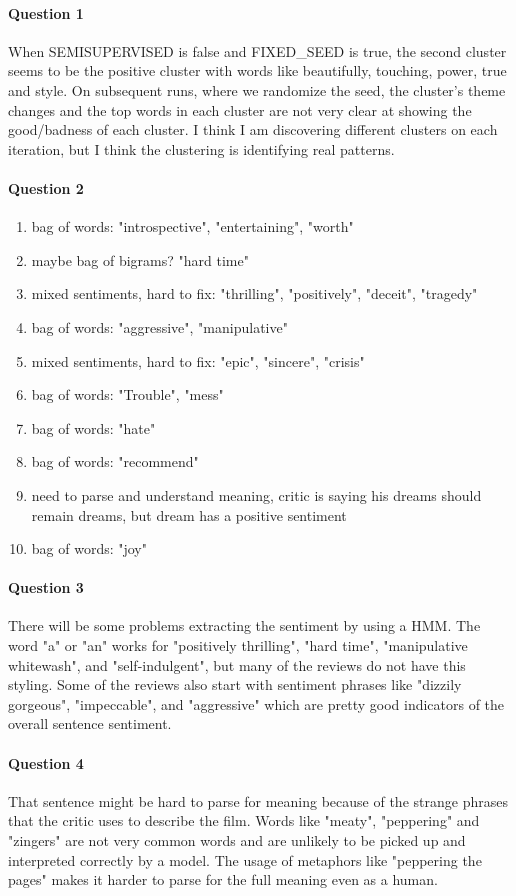 \documentclass[12pt]{article}
\newcommand{\myparagraph}[1]{\paragraph{#1}\mbox{}}
\begin{document}
\thispagestyle{fancy}

\myparagraph{Question 1}

When SEMISUPERVISED is false and FIXED\_SEED is true, the second cluster seems to be the positive cluster with words like beautifully, touching, power, true and style. On subsequent runs, where we randomize the seed, the cluster's theme changes and the top words in each cluster are not very clear at showing the good/badness of each cluster. I think I am discovering different clusters on each iteration, but I think the clustering is identifying real patterns.

\myparagraph{Question 2}

\begin{enumerate}
	\item bag of words: "introspective", "entertaining", "worth"
	\item maybe bag of bigrams? "hard time"
	\item mixed sentiments, hard to fix: "thrilling", "positively", "deceit", "tragedy"
	\item bag of words: "aggressive", "manipulative"
	\item mixed sentiments, hard to fix: "epic", "sincere", "crisis"
	\item bag of words: "Trouble", "mess"
	\item bag of words: "hate"
	\item bag of words: "recommend"
	\item need to parse and understand meaning, critic is saying his dreams should remain dreams, but dream has a positive sentiment
	\item bag of words: "joy"
\end{enumerate}

\myparagraph{Question 3}

There will be some problems extracting the sentiment by using a HMM. The word "a" or "an" works for "positively thrilling", "hard time", "manipulative whitewash", and "self-indulgent", but many of the reviews do not have this styling. Some of the reviews also start with sentiment phrases like "dizzily gorgeous", "impeccable", and "aggressive" which are pretty good indicators of the overall sentence sentiment.


\myparagraph{Question 4}
That sentence might be hard to parse for meaning because of the strange phrases that the critic uses to describe the film. Words like "meaty", "peppering" and "zingers" are not very common words and are unlikely to be picked up and interpreted correctly by a model. The usage of metaphors like "peppering the pages" makes it harder to parse for the full meaning even as a human.
\end{document}
